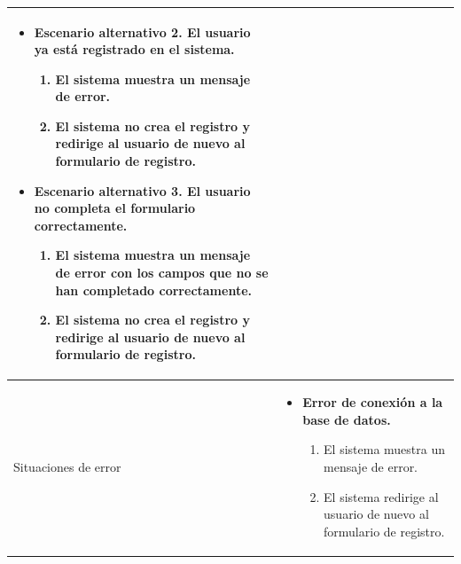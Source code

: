 \begin{longtable}{
    >{\columncolor{lightgreen!20}}p{4cm}
    p{12cm}
    }
\begin{itemize}[nosep,leftmargin=*]
\begin{enumerate}[nosep,leftmargin=*]
      \end{enumerate}
      \item \textbf{Escenario alternativo 2. El usuario ya está registrado en el sistema.}
      \begin{enumerate}[nosep,leftmargin=*]
          \item El sistema muestra un mensaje de error.
          \item El sistema no crea el registro y redirige al usuario de nuevo al formulario de registro.
      \end{enumerate}
      \item \textbf{Escenario alternativo 3. El usuario no completa el formulario correctamente.}
      \begin{enumerate}[nosep,leftmargin=*]
          \item El sistema muestra un mensaje de error con los campos que no se han completado correctamente.
          \item El sistema no crea el registro y redirige al usuario de nuevo al formulario de registro.
      \end{enumerate}
    \end{itemize} \\
    \midrule
    Situaciones de error & \begin{itemize}[nosep,leftmargin=*]
      \item \textbf{Error de conexión a la base de datos.}
      \begin{enumerate}[nosep,leftmargin=*]
          \item El sistema muestra un mensaje de error.
          \item El sistema redirige al usuario de nuevo al formulario de registro.
      \end{enumerate}
    \end{itemize} \\
    \end{longtable}



